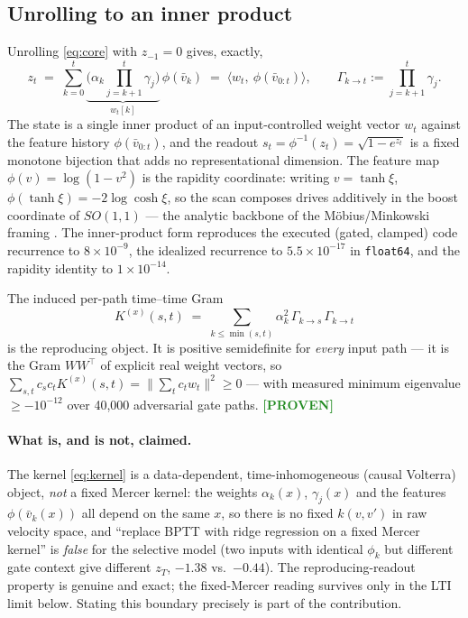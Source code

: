 \documentclass[11pt]{article}
\theoremstyle{definition}
\newcommand{\vbar}{\bar{v}}
\newcommand{\Gk}{\Gamma_{k\to t}}
\newcommand{\code}[1]{\texttt{#1}}
\newcommand{\PROVEN}{\textcolor{ForestGreen}{\textbf{[PROVEN]}}}
\begin{document}
\subsection{Unrolling to an inner product}
Unrolling \eqref{eq:core} with $z_{-1}=0$ gives, exactly,
\begin{equation}
z_t \;=\; \sum_{k=0}^{t} \underbrace{\Big(\alpha_k\!\!\prod_{j=k+1}^{t}\gamma_j\Big)}_{w_t[k]}\,\phi(\vbar_k)
\;=\; \langle w_t,\ \phi(\vbar_{0:t})\rangle,
\qquad \Gk := \prod_{j=k+1}^{t}\gamma_j .
\label{eq:innerprod}
\end{equation}
The state is a single inner product of an input-controlled weight vector $w_t$ against the
feature history $\phi(\vbar_{0:t})$, and the readout $s_t=\phi^{-1}(z_t)=\sqrt{1-e^{z_t}}$ is
a fixed monotone bijection that adds no representational dimension. The feature map
$\phi(v)=\log(1-v^2)$ is the rapidity coordinate: writing $v=\tanh\xi$,
$\phi(\tanh\xi)=-2\log\cosh\xi$, so the scan composes drives additively in the boost
coordinate of $SO(1,1)$ --- the analytic backbone of the M\"obius/Minkowski framing
\cite{foss2026markov}. The inner-product form reproduces the executed (gated, clamped) code
recurrence to $8\times10^{-9}$, the idealized recurrence to $5.5\times10^{-17}$ in
\code{float64}, and the rapidity identity to $1\times10^{-14}$.

The induced per-path time--time Gram
\begin{equation}
K^{(x)}(s,t) \;=\; \sum_{k\le\min(s,t)} \alpha_k^2\,\Gamma_{k\to s}\,\Gamma_{k\to t}
\label{eq:kernel}
\end{equation}
is the reproducing object. It is positive semidefinite for \emph{every} input path --- it is
the Gram $WW^\top$ of explicit real weight vectors, so
$\sum_{s,t} c_s c_t K^{(x)}(s,t)=\|\sum_t c_t w_t\|^2\ge 0$ --- with measured minimum
eigenvalue $\ge -10^{-12}$ over 40{,}000 adversarial gate paths. \PROVEN

\paragraph{What is, and is not, claimed.} The kernel \eqref{eq:kernel} is a data-dependent,
time-inhomogeneous (causal Volterra) object, \emph{not} a fixed Mercer kernel: the weights
$\alpha_k(x)$, $\gamma_j(x)$ and the features $\phi(\vbar_k(x))$ all depend on the same $x$,
so there is no fixed $k(v,v')$ in raw velocity space, and ``replace BPTT with ridge
regression on a fixed Mercer kernel'' is \emph{false} for the selective model (two inputs
with identical $\phi_k$ but different gate context give different $z_T$, $-1.38$ vs.\ $-0.44$).
The reproducing-readout property is genuine and exact; the fixed-Mercer reading survives only
in the LTI limit below. Stating this boundary precisely is part of the contribution.
\end{document}
